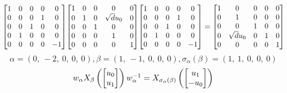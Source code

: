\documentclass[11pt]{article}
\theoremstyle{definition}
\begin{document}
\[
\scaletoalign{\textwidth}{{\left[\begin{matrix}1 & 0 & 0 & 0 & 0\\0 & 0 & 0 & 1 & 0\\0 & 0 & 1 & 0 & 0\\0 & 1 & 0 & 0 & 0\\0 & 0 & 0 & 0 & -1\end{matrix}\right]} {\left[\begin{matrix}1 & 0 & 0 & 0 & 0\\0 & 1 & 0 & \sqrt{d} u_{0} & 0\\0 & 0 & 1 & 0 & 0\\0 & 0 & 0 & 1 & 0\\0 & 0 & 0 & 0 & 1\end{matrix}\right]} {\left[\begin{matrix}1 & 0 & 0 & 0 & 0\\0 & 0 & 0 & 1 & 0\\0 & 0 & 1 & 0 & 0\\0 & 1 & 0 & 0 & 0\\0 & 0 & 0 & 0 & -1\end{matrix}\right]} = {\left[\begin{matrix}1 & 0 & 0 & 0 & 0\\0 & 1 & 0 & 0 & 0\\0 & 0 & 1 & 0 & 0\\0 & \sqrt{d} u_{0} & 0 & 1 & 0\\0 & 0 & 0 & 0 & 1\end{matrix}\right]}}
\]
\[
\alpha = \left( 0, \  -2, \  0, \  0, \  0\right), \beta = \left( 1, \  -1, \  0, \  0, \  0\right), \sigma_{\alpha}(\beta) = \left( 1, \  1, \  0, \  0, \  0\right)
\]
\[
\scaletoalign{\textwidth}{w_{\alpha} X_{\beta}\left(\left[\begin{matrix}u_{0}\\u_{1}\end{matrix}\right]\right) w_{\alpha}^{-1} = X_{\sigma_{\alpha}\left(\beta\right)}\left(\left[\begin{matrix}u_{1}\\- u_{0}\end{matrix}\right]\right)}
\]
\end{document}
